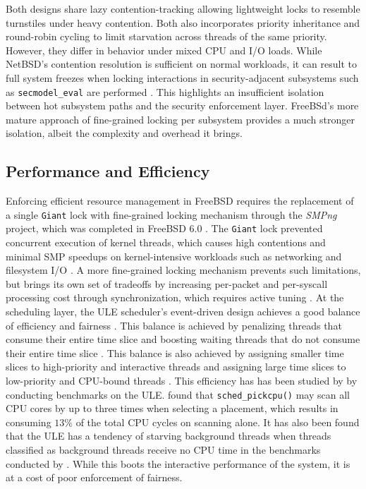 Both designs share lazy contention-tracking allowing lightweight locks to resemble turnstiles under heavy contention. Both
also incorporates priority inheritance and round-robin cycling to limit starvation across threads of the same priority. However,
they differ in behavior under mixed CPU and I/O loads. While NetBSD's contention resolution is sufficient on normal workloads,
it can result to full system freezes when locking interactions in security-adjacent subsystems such as \texttt{secmodel\_eval}
are performed \parencite{petermann_jails}. This highlights an insufficient isolation between hot subsystem paths and the security
enforcement layer. FreeBSd's more mature approach of fine-grained locking per subsystem provides a much stronger isolation,
albeit the complexity and overhead it brings.

\subsection{Performance and Efficiency} \label{resource-performance} %

Enforcing efficient resource management in FreeBSD requires the replacement of a single \texttt{Giant} lock with fine-grained
locking mechanism through the \textit{SMPng} project, which was completed in FreeBSD 6.0 \parencite{freebsd_smp}.
The \texttt{Giant} lock prevented concurrent execution of kernel threads, which causes high contentions and minimal SMP speedups
on kernel-intensive workloads such as networking and filesystem I/O \parencite{freebsd_smp}. A more fine-grained locking
mechanism prevents such limitations, but brings its own set of tradeoffs by increasing per-packet and per-syscall processing
cost through synchronization, which requires active tuning \parencite{freebsd_smp}. At the scheduling layer, the ULE scheduler's
event-driven design achieves a good balance of efficiency and fairness \parencite{roberson_ule}. This balance is achieved by
penalizing threads that consume their entire time slice and boosting waiting threads that do not consume their entire time slice
\parencite{roberson_ule}. This balance is also achieved by assigning smaller time slices to high-priority and interactive
threads and assigning large time slices to low-priority and CPU-bound threads \parencite{roberson_ule}. This efficiency has
has been studied by \textcite{bouron2018} by conducting benchmarks on the ULE. \textcite{bouron2018} found that
\texttt{sched\_pickcpu()} may scan all CPU cores by up to three times when selecting a placement, which results in consuming
$13\%$ of the total CPU cycles on scanning alone. It has also been found that the ULE has a tendency of starving background
threads when threads classified as background threads receive no CPU time in the benchmarks conducted by \parencite{bouron2018}.
While this boots the interactive performance of the system, it is at a cost of poor enforcement of fairness.

